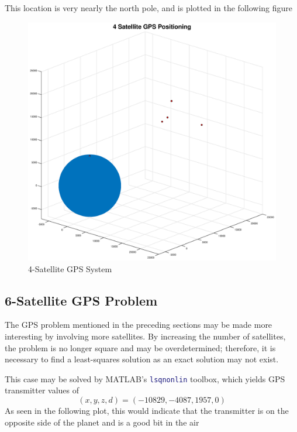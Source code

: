 \documentclass[10pt,a4paper]{article}
\begin{document}
This location is very nearly the north pole, and is plotted in the following figure

\begin{figure}[H]
\includegraphics[width=\linewidth]{Figures/4satgps.eps}
\caption{4-Satellite GPS System}
\label{fig: 4satgps}
\end{figure}

\subsection*{6-Satellite GPS Problem}

The GPS problem mentioned in the preceding sections may be made more interesting by involving more satellites. By increasing the number of satellites, the problem is no longer square and may be overdetermined; therefore, it is necessary to find a least-squares solution as an exact solution may not exist.

This case may be solved by MATLAB's \lstinline[language=Matlab]|lsqnonlin| toolbox, which yields GPS transmitter values of
$$
(x, y, z, d) = (-10829, -4087, 1957, 0)
$$
As seen in the following plot, this would indicate that the transmitter is on the opposite side of the planet and is a good bit in the air
\end{document}
